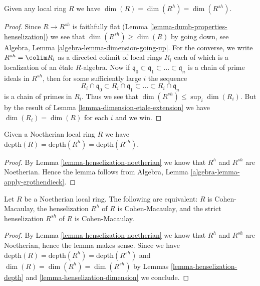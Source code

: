 \begin{lemma}
\label{lemma-henselization-dimension}
Given any local ring $R$ we have $\dim(R) = \dim(R^h) = \dim(R^{sh})$.
\end{lemma}

\begin{proof}
Since $R \to R^{sh}$ is faithfully flat
(Lemma \ref{lemma-dumb-properties-henselization})
we see that $\dim(R^{sh}) \geq \dim(R)$ by going down, see
Algebra, Lemma \ref{algebra-lemma-dimension-going-up}.
For the converse, we write $R^{sh} = \colim R_i$ as
a directed colimit of local rings $R_i$ each of which is a
localization of an \'etale $R$-algebra. Now if
$\mathfrak q_0 \subset \mathfrak q_1 \subset \ldots \subset \mathfrak q_n$
is a chain of prime ideals in $R^{sh}$, then for some sufficiently
large $i$ the sequence
$$
R_i \cap \mathfrak q_0 \subset
R_i \cap \mathfrak q_1 \subset \ldots \subset
R_i \cap \mathfrak q_n
$$
is a chain of primes in $R_i$. Thus we see that
$\dim(R^{sh}) \leq \sup_i \dim(R_i)$.
But by the result of
Lemma \ref{lemma-dimension-etale-extension}
we have $\dim(R_i) = \dim(R)$ for each $i$ and we win.
\end{proof}

\begin{lemma}
\label{lemma-henselization-depth}
Given a Noetherian local ring $R$ we have
$\text{depth}(R) = \text{depth}(R^h) = \text{depth}(R^{sh})$.
\end{lemma}

\begin{proof}
By
Lemma \ref{lemma-henselization-noetherian}
we know that $R^h$ and $R^{sh}$ are Noetherian. Hence the lemma follows
from
Algebra, Lemma \ref{algebra-lemma-apply-grothendieck}.
\end{proof}

\begin{lemma}
\label{lemma-henselization-CM}
Let $R$ be a Noetherian local ring. The following are equivalent:
$R$ is Cohen-Macaulay, the henselization $R^h$ of $R$ is Cohen-Macaulay,
and the strict henselization $R^{sh}$ of $R$ is Cohen-Macaulay.
\end{lemma}

\begin{proof}
By
Lemma \ref{lemma-henselization-noetherian}
we know that $R^h$ and $R^{sh}$ are Noetherian, hence the lemma makes
sense. Since we have
$\text{depth}(R) = \text{depth}(R^h) = \text{depth}(R^{sh})$
and
$\dim(R) = \dim(R^h) = \dim(R^{sh})$
by
Lemmas \ref{lemma-henselization-depth} and
\ref{lemma-henselization-dimension}
we conclude.
\end{proof}


